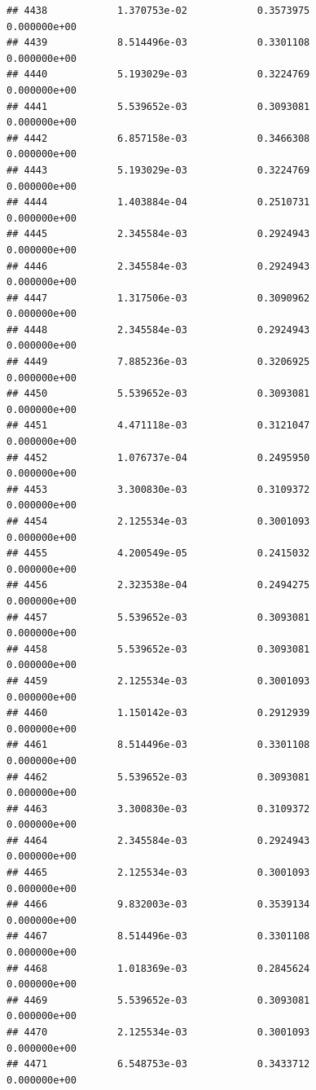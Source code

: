 \documentclass[
]{article}
\begin{document}
\begin{verbatim}
## 4438            1.370753e-02            0.3573975            0.000000e+00
## 4439            8.514496e-03            0.3301108            0.000000e+00
## 4440            5.193029e-03            0.3224769            0.000000e+00
## 4441            5.539652e-03            0.3093081            0.000000e+00
## 4442            6.857158e-03            0.3466308            0.000000e+00
## 4443            5.193029e-03            0.3224769            0.000000e+00
## 4444            1.403884e-04            0.2510731            0.000000e+00
## 4445            2.345584e-03            0.2924943            0.000000e+00
## 4446            2.345584e-03            0.2924943            0.000000e+00
## 4447            1.317506e-03            0.3090962            0.000000e+00
## 4448            2.345584e-03            0.2924943            0.000000e+00
## 4449            7.885236e-03            0.3206925            0.000000e+00
## 4450            5.539652e-03            0.3093081            0.000000e+00
## 4451            4.471118e-03            0.3121047            0.000000e+00
## 4452            1.076737e-04            0.2495950            0.000000e+00
## 4453            3.300830e-03            0.3109372            0.000000e+00
## 4454            2.125534e-03            0.3001093            0.000000e+00
## 4455            4.200549e-05            0.2415032            0.000000e+00
## 4456            2.323538e-04            0.2494275            0.000000e+00
## 4457            5.539652e-03            0.3093081            0.000000e+00
## 4458            5.539652e-03            0.3093081            0.000000e+00
## 4459            2.125534e-03            0.3001093            0.000000e+00
## 4460            1.150142e-03            0.2912939            0.000000e+00
## 4461            8.514496e-03            0.3301108            0.000000e+00
## 4462            5.539652e-03            0.3093081            0.000000e+00
## 4463            3.300830e-03            0.3109372            0.000000e+00
## 4464            2.345584e-03            0.2924943            0.000000e+00
## 4465            2.125534e-03            0.3001093            0.000000e+00
## 4466            9.832003e-03            0.3539134            0.000000e+00
## 4467            8.514496e-03            0.3301108            0.000000e+00
## 4468            1.018369e-03            0.2845624            0.000000e+00
## 4469            5.539652e-03            0.3093081            0.000000e+00
## 4470            2.125534e-03            0.3001093            0.000000e+00
## 4471            6.548753e-03            0.3433712            0.000000e+00

\end{verbatim}
\end{document}
